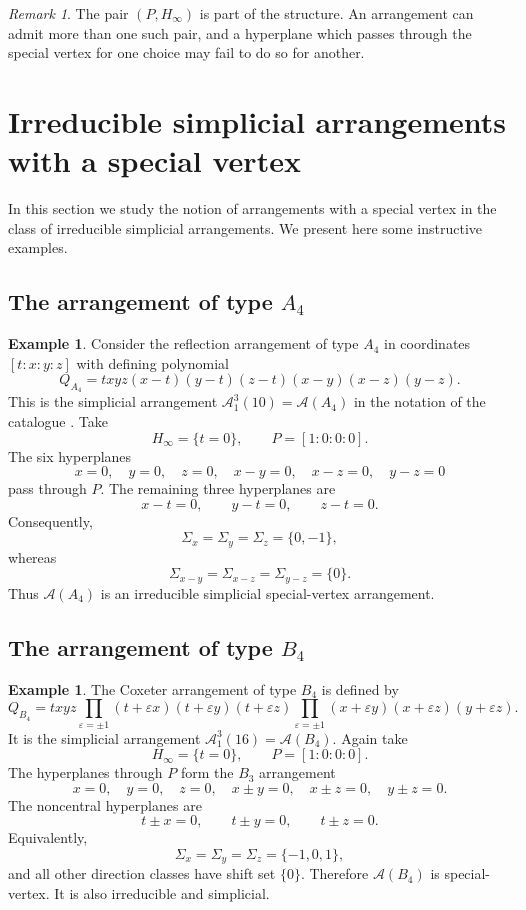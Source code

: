 \documentclass[11pt]{article}
\theoremstyle{definition}
\newtheorem{example}[theorem]{Example}
\theoremstyle{remark}
\newtheorem{remark}[theorem]{Remark}
\newcommand{\cA}{\mathcal A}
\begin{document}
\begin{remark}
The pair $(P,H_\infty)$ is part of the structure.  An arrangement can
admit more than one such pair, and a hyperplane which passes through the
special vertex for one choice may fail to do so for another.
\end{remark}

\section{Irreducible simplicial arrangements with a special vertex}
\label{sec:positive}
In this section we study the notion of arrangements with a special vertex in the class of irreducible simplicial arrangements. We present here some instructive examples.
\subsection{The arrangement of type \texorpdfstring{$A_4$}{A4}}

\begin{example}\label{ex:A4}
Consider the reflection arrangement of type $A_4$ in coordinates
$[t:x:y:z]$ with defining polynomial
\[
 Q_{A_4}
 =txyz(x-t)(y-t)(z-t)(x-y)(x-z)(y-z).
\]
This is the simplicial arrangement
$\cA^3_1(10)=\cA(A_4)$ in the notation of the catalogue
\cite{Geis}.  Take
\[
 H_\infty=\{t=0\},
 \qquad
 P=[1:0:0:0].
\]
The six hyperplanes
\[
 x=0,\quad y=0,\quad z=0,\quad
 x-y=0,\quad x-z=0,\quad y-z=0
\]
pass through $P$.  The remaining three hyperplanes are
\[
 x-t=0,\qquad y-t=0,\qquad z-t=0.
\]
Consequently,
\[
 \Sigma_x=\Sigma_y=\Sigma_z=\{0,-1\},
\]
whereas
\[
 \Sigma_{x-y}=\Sigma_{x-z}=\Sigma_{y-z}=\{0\}.
\]
Thus $\cA(A_4)$ is an irreducible simplicial special-vertex arrangement.
\end{example}

\subsection{The arrangement of type \texorpdfstring{$B_4$}{B4}}

\begin{example}\label{ex:B4}
The Coxeter arrangement of type $B_4$ is defined by
\[
 Q_{B_4}=txyz
 \prod_{\varepsilon=\pm1}
 (t+\varepsilon x)(t+\varepsilon y)(t+\varepsilon z)
 \prod_{\varepsilon=\pm1}
 (x+\varepsilon y)(x+\varepsilon z)(y+\varepsilon z).
\]
It is the simplicial arrangement
$\cA^3_1(16)=\cA(B_4)$.  Again take
\[
 H_\infty=\{t=0\},
 \qquad
 P=[1:0:0:0].
\]
The hyperplanes through $P$ form the $B_3$ arrangement
\[
 x=0,\quad y=0,\quad z=0,\quad
 x\pm y=0,\quad x\pm z=0,\quad y\pm z=0.
\]
The noncentral hyperplanes are
\[
 t\pm x=0,\qquad t\pm y=0,\qquad t\pm z=0.
\]
Equivalently,
\[
 \Sigma_x=\Sigma_y=\Sigma_z=\{-1,0,1\},
\]
and all other direction classes have shift set $\{0\}$.  Therefore
$\cA(B_4)$ is special-vertex.  It is also irreducible and simplicial.
\end{example}
\end{document}
